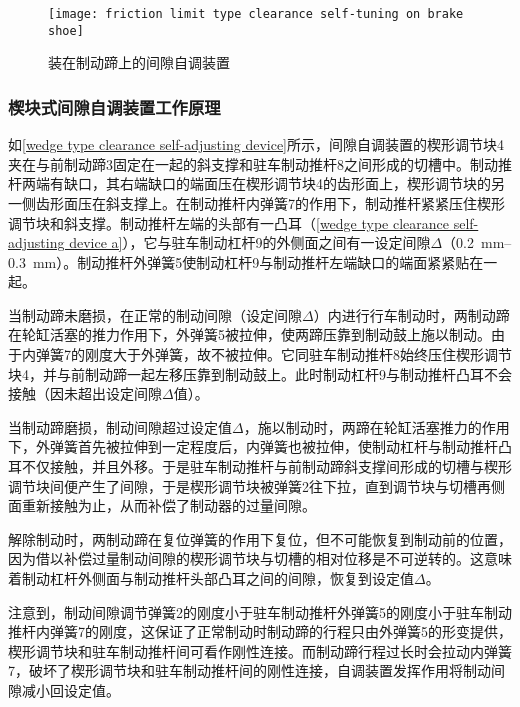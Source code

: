 \documentclass[UTF8]{ctexart}
\numberwithin{figure}{section}
\numberwithin{table}{section}
\begin{document}
\begin{figure}[htbp]
	\centering
	\begin{minipage}[b]{0.5\textwidth}
		\centering
		\texttt{[image: friction limit type clearance self-tuning on brake shoe]}
		\caption{装在制动蹄上的间隙自调装置}
		\label{friction limit type clearance self-tuning on brake shoe}
	\end{minipage}
\end{figure}

\subsubsection{楔块式间隙自调装置工作原理}

如\cref{wedge type clearance self-adjusting device}所示，间隙自调装置的楔形调节块4夹在与前制动蹄3固定在一起的斜支撑和驻车制动推杆8之间形成的切槽中。制动推杆两端有缺口，其右端缺口的端面压在楔形调节块4的齿形面上，楔形调节块的另一侧齿形面压在斜支撑上。在制动推杆内弹簧7的作用下，制动推杆紧紧压住楔形调节块和斜支撑。制动推杆左端的头部有一凸耳（\cref{wedge type clearance self-adjusting device a}），它与驻车制动杠杆9的外侧面之间有一设定间隙$\Delta$（\qtyrange[range-phrase = $\,\sim\,$, range-units = single]{0.2}{0.3}{\mm}）。制动推杆外弹簧5使制动杠杆9与制动推杆左端缺口的端面紧紧贴在一起。

当制动蹄未磨损，在正常的制动间隙（设定间隙$\Delta$）内进行行车制动时，两制动蹄在轮缸活塞的推力作用下，外弹簧5被拉伸，使两蹄压靠到制动鼓上施以制动。由于内弹簧7的刚度大于外弹簧，故不被拉伸。它同驻车制动推杆8始终压住楔形调节块4，并与前制动蹄一起左移压靠到制动鼓上。此时制动杠杆9与制动推杆凸耳不会接触（因未超出设定间隙$\Delta$值）。

当制动蹄磨损，制动间隙超过设定值$\Delta$，施以制动时，两蹄在轮缸活塞推力的作用下，外弹簧首先被拉伸到一定程度后，内弹簧也被拉伸，使制动杠杆与制动推杆凸耳不仅接触，并且外移。于是驻车制动推杆与前制动蹄斜支撑间形成的切槽与楔形调节块间便产生了间隙，于是楔形调节块被弹簧2往下拉，直到调节块与切槽再侧面重新接触为止，从而补偿了制动器的过量间隙。

解除制动时，两制动蹄在复位弹簧的作用下复位，但不可能恢复到制动前的位置，因为借以补偿过量制动间隙的楔形调节块与切槽的相对位移是不可逆转的。这意味着制动杠杆外侧面与制动推杆头部凸耳之间的间隙，恢复到设定值$\Delta$。

注意到，制动间隙调节弹簧2的刚度小于驻车制动推杆外弹簧5的刚度小于驻车制动推杆内弹簧7的刚度，这保证了正常制动时制动蹄的行程只由外弹簧5的形变提供，楔形调节块和驻车制动推杆间可看作刚性连接。而制动蹄行程过长时会拉动内弹簧7，破坏了楔形调节块和驻车制动推杆间的刚性连接，自调装置发挥作用将制动间隙减小回设定值。
\end{document}
